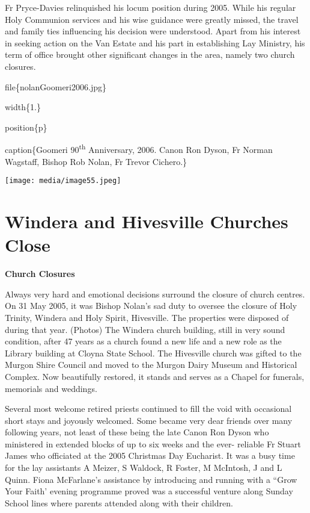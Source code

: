 Fr Pryce-Davies relinquished his locum position during 2005. While his regular Holy Communion services and his wise guidance were greatly missed, the travel and family ties influencing his decision were understood. Apart from his interest in seeking action on the Van Estate and his part in establishing Lay Ministry, his term of office brought other significant changes in the area, namely two church closures.

file\{nolanGoomeri2006.jpg\}

width\{1.\}

position\{p\}

caption\{Goomeri 90\textsuperscript{th} Anniversary, 2006. Canon Ron Dyson, Fr Norman Wagstaff, Bishop Rob Nolan, Fr Trevor Cichero.\}

\texttt{[image: media/image55.jpeg]}

\hypertarget{windera-and-hivesville-churches-close}{%
\section{Windera and Hivesville Churches Close}\label{windera-and-hivesville-churches-close}}

\textbf{Church Closures}

Always very hard and emotional decisions surround the closure of church centres. On 31 May 2005, it was Bishop Nolan's sad duty to oversee the closure of Holy Trinity, Windera and Holy Spirit, Hivesville. The properties were disposed of during that year. (Photos) The Windera church building, still in very sound condition, after 47 years as a church found a new life and a new role as the Library building at Cloyna State School. The Hivesville church was gifted to the Murgon Shire Council and moved to the Murgon Dairy Museum and Historical Complex. Now beautifully restored, it stands and serves as a Chapel for funerals, memorials and weddings.

Several most welcome retired priests continued to fill the void with occasional short stays and joyously welcomed. Some became very dear friends over many following years, not least of these being the late Canon Ron Dyson who ministered in extended blocks of up to six weeks and the ever- reliable Fr Stuart James who officiated at the 2005 Christmas Day Eucharist. It was a busy time for the lay assistants A Meizer, S Waldock, R Foster, M McIntosh, J and L Quinn. Fiona McFarlane's assistance by introducing and running with a ``Grow Your Faith' evening programme proved was a successful venture along Sunday School lines where parents attended along with their children.

